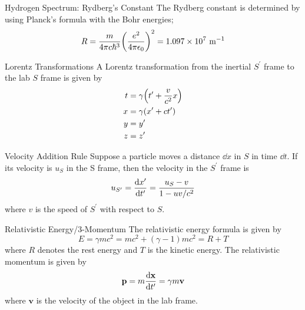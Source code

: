\documentclass[avery5371,grid]{flashcards}
\begin{document}
\begin{flashcard}[Formula]{Hydrogen Spectrum: Rydberg's Constant}
	The Rydberg constant is determined by using Planck's formula with the Bohr energies;
	\begin{equation*}
		R = \frac{m}{4\pi c\hbar^3}\qty(\frac{e^2}{4\pi \epsilon_0})^2 = 1.097\times 10^{7}\text{ m}^{-1}
	\end{equation*}
\end{flashcard}



\begin{flashcard}[Definition]{Lorentz Transformations}
	A Lorentz transformation from the inertial $S^\prime$ frame to the lab $S$ frame is given by
	\begin{align*}
		t &= \gamma\qty(t^\prime + \frac{v}{c^2}x) \\
		x &= \gamma\qty(x^\prime + c t^\prime)\\
		y &= y^\prime\\
		z &= z^\prime 
	\end{align*}
\end{flashcard}

\begin{flashcard}[Formula]{Velocity Addition Rule}
	Suppose a particle moves a distance $\dd x$ in $S$ in time $\dd t$. If its velocity is $u_S$ in the S frame, then the velocity in the $S^\prime$ frame is
	\begin{align*}
		u_{S^\prime} = \dv{x^\prime}{t^\prime} = \frac{u_S - v}{1- uv/c^2}
	\end{align*}
	where $v$ is the speed of $S^\prime$ with respect to $S$.
\end{flashcard}

\begin{flashcard}[Formula]{Relativistic Energy/3-Momentum}
	The relativistic energy formula is given by
	\begin{equation*}
		E = \gamma m c^2 = mc^2 + (\gamma - 1)m c^2 = R + T
	\end{equation*}
	where $R$ denotes the rest energy and $T$ is the kinetic energy. The relativistic momentum is given by
	\begin{equation*}
		\mathbf{p} = m \dv{\mathbf{x}}{t^\prime}=\gamma m \mathbf{v}
	\end{equation*}
	where $\mathbf{v}$ is the velocity of the object in the lab frame.
\end{flashcard}
\end{document}
